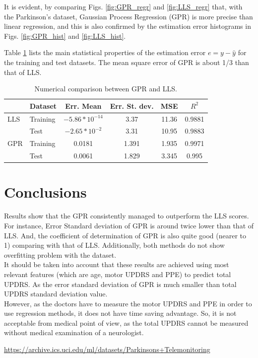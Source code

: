 \documentclass[12pt]{article}
\begin{document}
It is evident, by comparing Figs. \ref{fig:GPR_regr} and \ref{fig:LLS_regr} that, with the Parkinson's dataset, Gaussian Process Regression (GPR) is more precise than linear regression, and this is also confirmed by the estimation error histograms in Figs. \ref{fig:GPR_hist} and \ref{fig:LLS_hist}. 

Table \ref{ta:res} lists the main statistical properties of the estimation error $e=y-\hat{y}$ for the training and test datasets.
The mean square error of GPR is about 1/3 than that of LLS. 

\begin{table}[h]
    \centering
    \begin{tabular}{|l|l|c|c|c|c|}
    \hline
&  Dataset      & Err. Mean & Err. St. dev. & MSE & $R^2$\\
\hline
LLS &Training   & $-5.86*10^{-14}$  & 3.37  & 11.36  & 0.9881\\
    &Test       & $-2.65*10^{-2}$  & 3.31  & 10.95  & 0.9883\\
\hline
GPR &Training   & 0.0181  & 1.391  & 1.935  & 0.9971\\
    &Test       & 0.0061  & 1.829  & 3.345  & 0.995\\
\hline
    \end{tabular}
    \caption{Numerical comparison between GPR and LLS.}
    \label{ta:res}
\end{table}

\section{Conclusions}

Results show that the GPR consistently managed to outperform the LLS scores. For instance, Error Standard deviation of GPR is around twice lower than that of LLS. And, the coefficient of determination of GPR is also quite good (nearer to 1) comparing with that of LLS. Additionally, both methods do not show overfitting problem with the dataset.\\
It should be taken into account that these results are achieved using most relevant features (which are age, motor UPDRS and PPE) to predict total UPDRS. As the error standard deviation of GPR is much smaller than total UPDRS standard deviation value.\\
However, as the doctors have to measure the motor UPDRS and PPE in order to use regression methods, it does not have time saving advantage. So, it is not acceptable from medical point of view, as the total UPDRS cannot be measured without medical examination of a neurologist.


\begin{thebibliography}{9}
 \url{https://archive.ics.uci.edu/ml/datasets/Parkinsons+Telemonitoring}

\end{thebibliography}
\end{document}
